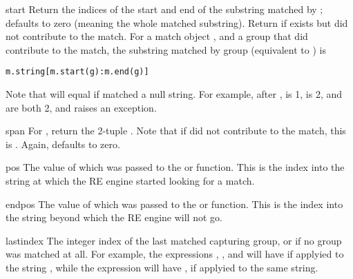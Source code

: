\begin{methoddesc}[MatchObject]{start}{}
Return the indices of the start and end of the substring
matched by ;  defaults to zero (meaning the whole
matched substring).
Return  if  exists but
did not contribute to the match.  For a match object
, and a group  that did contribute to the match, the
substring matched by group  (equivalent to
) is

\begin{verbatim}
m.string[m.start(g):m.end(g)]
\end{verbatim}

Note that
 will equal  if
 matched a null string.  For example, after ,  is 1,
 is 2,  and
 are both 2, and  raises
an  exception.
\end{methoddesc}

\begin{methoddesc}[MatchObject]{span}{}
For  , return the 2-tuple
.
Note that if  did not contribute to the match, this is
.  Again,  defaults to zero.
\end{methoddesc}

\begin{memberdesc}[MatchObject]{pos}
The value of  which was passed to the
 or  function.  This is the index
into the string at which the RE engine started looking for a match.
\end{memberdesc}

\begin{memberdesc}[MatchObject]{endpos}
The value of  which was passed to the
 or  function.  This is the index
into the string beyond which the RE engine will not go.
\end{memberdesc}

\begin{memberdesc}[MatchObject]{lastindex}
The integer index of the last matched capturing group, or 
if no group was matched at all. For example, the expressions
, , and  will have
 if applyied to the string ,
while the expression  will have ,
if applyied to the same string.
\end{memberdesc}

